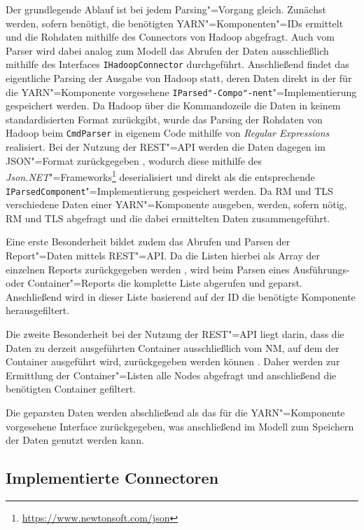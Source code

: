 Der grundlegende Ablauf ist bei jedem Parsing"=Vorgang gleich.
Zunächst werden, sofern benötigt, die benötigten YARN"=Komponenten"=IDs ermittelt und die Rohdaten mithilfe des Connectors von Hadoop abgefragt.
Auch vom Parser wird dabei analog zum Modell das Abrufen der Daten ausschließlich mithilfe des Interfaces \texttt{IHadoopConnector} durchgeführt.
Anschließend findet das eigentliche Parsing der Ausgabe von Hadoop statt, deren Daten direkt in der für die YARN"=Komponente vorgesehene \texttt{IParsed"-Compo"-nent}"=Implementierung gespeichert werden.
Da Hadoop über die Kommandozeile die Daten in keinem standardisierten Format zurückgibt, wurde das Parsing der Rohdaten von Hadoop beim \texttt{CmdParser} in eigenem Code mithilfe von \emph{Regular Expressions} realisiert.
Bei der Nutzung der REST"=API werden die Daten dagegen im JSON"=Format zurückgegeben \cite{HadoopYarnTlServer271,HadoopRmApi271,HadoopNmApi271}, wodurch diese mithilfe des \emph{Json.NET}"=Frameworks\footnote{\url{https://www.newtonsoft.com/json}} deserialisiert und direkt als die entsprechende \texttt{IParsedComponent}"=Implementierung gespeichert werden.
Da \ac{RM} und \ac{TLS} verschiedene Daten einer YARN"=Komponente ausgeben, werden, sofern nötig, \ac{RM} und \ac{TLS} abgefragt und die dabei ermittelten Daten zusammengeführt.

Eine erste Besonderheit bildet zudem das Abrufen und Parsen der Report"=Daten mittels REST"=API.
Da die Listen hierbei als Array der einzelnen Reports zurückgegeben werden \cite{HadoopYarnTlServer271,HadoopRmApi271,HadoopNmApi271}, wird beim Parsen eines Ausführungs- oder Container"=Reports die komplette Liste abgerufen und geparst.
Anschließend wird in dieser Liste basierend auf der ID die benötigte Komponente herausgefiltert.

Die zweite Besonderheit bei der Nutzung der REST"=API liegt darin, dass die Daten zu derzeit ausgeführten Container ausschließlich vom \ac{NM}, auf dem der Container ausgeführt wird, zurückgegeben werden können \cite{HadoopRmApi271,HadoopNmApi271}.
Daher werden zur Ermittlung der Container"=Listen alle Nodes abgefragt und anschließend die benötigten Container gefiltert.

Die geparsten Daten werden abschließend als das für die YARN"=Komponente vorgesehene Interface zurückgegeben, was anschließend im Modell zum Speichern der Daten genutzt werden kann.

\subsection{Implementierte Connectoren}
\label{sec:implementedConnectors}

